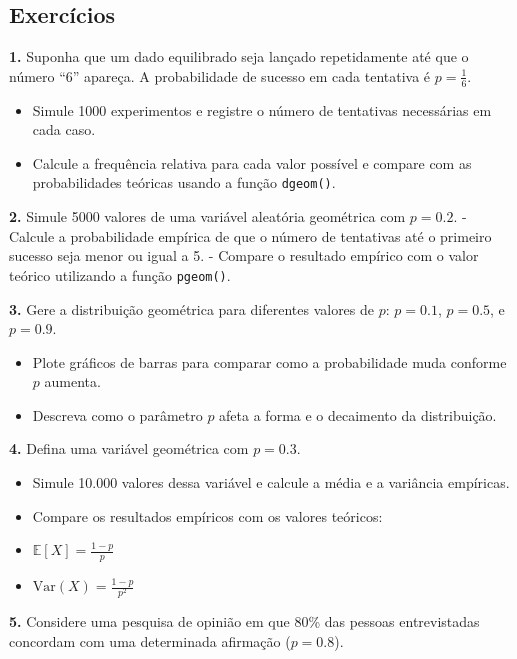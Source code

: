 \documentclass[
]{book}
\providecommand{\tightlist}{%
  \setlength{\itemsep}{0pt}\setlength{\parskip}{0pt}}
\begin{document}
\subsection{Exercícios}\label{exercuxedcios-26}

\textbf{1.} Suponha que um dado equilibrado seja lançado repetidamente até que o número ``6'' apareça. A probabilidade de sucesso em cada tentativa é \(p = \frac{1}{6}\).

\begin{itemize}
\tightlist
\item
  Simule 1000 experimentos e registre o número de tentativas necessárias em cada caso.
\item
  Calcule a frequência relativa para cada valor possível e compare com as probabilidades teóricas usando a função \texttt{dgeom()}.
\end{itemize}

\textbf{2.} Simule 5000 valores de uma variável aleatória geométrica com \(p = 0.2\).
- Calcule a probabilidade empírica de que o número de tentativas até o primeiro sucesso seja menor ou igual a 5.
- Compare o resultado empírico com o valor teórico utilizando a função \texttt{pgeom()}.

\textbf{3.} Gere a distribuição geométrica para diferentes valores de \(p\): \(p= 0.1\), \(p = 0.5\), e \(p = 0.9\).

\begin{itemize}
\tightlist
\item
  Plote gráficos de barras para comparar como a probabilidade muda conforme \(p\) aumenta.
\item
  Descreva como o parâmetro \(p\) afeta a forma e o decaimento da distribuição.
\end{itemize}

\textbf{4.} Defina uma variável geométrica com \(p = 0.3\).

\begin{itemize}
\tightlist
\item
  Simule 10.000 valores dessa variável e calcule a média e a variância empíricas.
\item
  Compare os resultados empíricos com os valores teóricos:
\item
  \(\mathbb{E}[X] = \frac{1-p}{p}\)
\item
  \(\text{Var}(X) = \frac{1-p}{p^2}\)
\end{itemize}

\textbf{5.} Considere uma pesquisa de opinião em que 80\% das pessoas entrevistadas concordam com uma determinada afirmação (\(p = 0.8\)).
\end{document}

